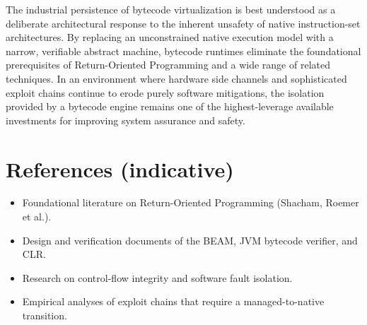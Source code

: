 \documentclass{article}
\begin{document}
The industrial persistence of bytecode virtualization is best understood as a deliberate architectural response to the inherent unsafety of native instruction-set architectures. By replacing an unconstrained native execution model with a narrow, verifiable abstract machine, bytecode runtimes eliminate the foundational prerequisites of Return-Oriented Programming and a wide range of related techniques. In an environment where hardware side channels and sophisticated exploit chains continue to erode purely software mitigations, the isolation provided by a bytecode engine remains one of the highest-leverage available investments for improving system assurance and safety.

\section*{References (indicative)}

\begin{itemize}
  \item Foundational literature on Return-Oriented Programming (Shacham, Roemer et al.).
  \item Design and verification documents of the BEAM, JVM bytecode verifier, and CLR.
  \item Research on control-flow integrity and software fault isolation.
  \item Empirical analyses of exploit chains that require a managed-to-native transition.
\end{itemize}
\end{document}
